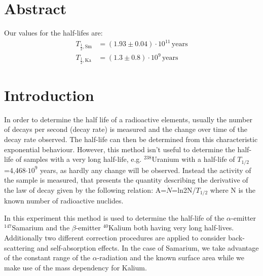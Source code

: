 \documentclass[12pt]{article}
\title{\vspace{0cm}{\Huge Fortgeschrittenen-Praktikum I:\\ \vspace{1cm} LHWZ}}
\author{Saskia Bondza\\Simon Stephan}
\date{Durchgeführt am 02.09.2016 und 05.09.2016}
\begin{document}
\maketitle
\newpage

\section*{Abstract}

Our values for the half-lifes are:
\begin{align*}
T_{\frac12,\text{Sm}}&=\left(1.93\pm0.04\right)\cdot10^{11}\,\text{years}\\
T_{\frac12,\text{Ka}}&=\left(1.3 \pm0.8 \right)\cdot10^{9} \,\text{years}
\end{align*}

\newpage

\thispagestyle{empty}
\tableofcontents
\newpage

\section{Introduction}
In order to determine the half life of a radioactive elements, usually the number of decays per second (decay rate) is measured and the change over time of the decay rate observed. The half-life can then be determined from this characteristic exponential behaviour. However, this method isn't useful to determine the half-life of samples with a very long half-life, e.g. ${}^{238}$Uranium with a half-life of $T_{1/2}$=4,468$\cdot 10^9$ years, as hardly any change will be observed. Instead the activity of the sample is measured, that presents the quantity describing the derivative of the law of decay given by the following relation: A=$\dot{N}$=ln2N/$T_{1/2}$ where N is the known number of radioactive nuclides.

In this experiment this method is used to determine the half-life of the $\alpha$-emitter ${}^{147}$Samarium and the $\beta$-emitter ${}^{40}$Kalium both having very long half-lives. Additionally two different correction procedures are applied to consider back-scattering and self-absorption effects. 
In the case of Samarium, we take advantage of the constant range of the  $\alpha$-radiation and the known surface area while we make use of the mass dependency for Kalium.
\end{document}
